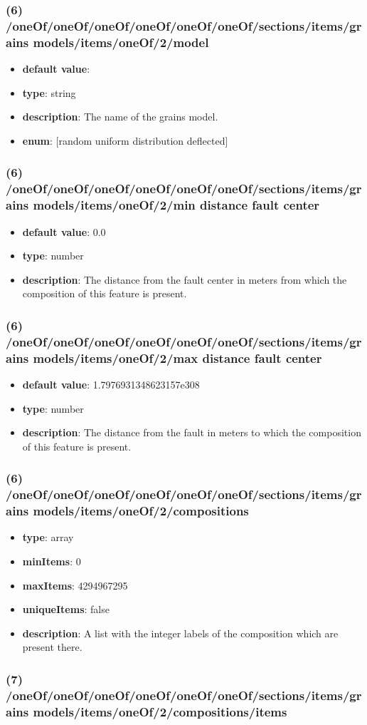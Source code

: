 \subsubsection{(6) /oneOf/oneOf/oneOf/oneOf/oneOf/oneOf/sections/items/grains models/items/oneOf/2/model}
\begin{itemize}[leftmargin=6em]\item {\bf default value}: 
\item {\bf type}: string
\item {\bf description}: The name of the grains model.
\item {\bf enum}: [random uniform distribution deflected]\end{itemize}\subsubsection{(6) /oneOf/oneOf/oneOf/oneOf/oneOf/oneOf/sections/items/grains models/items/oneOf/2/min distance fault center}
\begin{itemize}[leftmargin=6em]\item {\bf default value}: 0.0
\item {\bf type}: number
\item {\bf description}: The distance from the fault center in meters from which the composition of this feature is present.
\end{itemize}\subsubsection{(6) /oneOf/oneOf/oneOf/oneOf/oneOf/oneOf/sections/items/grains models/items/oneOf/2/max distance fault center}
\begin{itemize}[leftmargin=6em]\item {\bf default value}: 1.7976931348623157e308
\item {\bf type}: number
\item {\bf description}: The distance from the fault in meters to which the composition of this feature is present.
\end{itemize}\subsubsection{(6) /oneOf/oneOf/oneOf/oneOf/oneOf/oneOf/sections/items/grains models/items/oneOf/2/compositions}
\begin{itemize}[leftmargin=6em]\item {\bf type}: array
\item {\bf minItems}: 0
\item {\bf maxItems}: 4294967295
\item {\bf uniqueItems}: false
\item {\bf description}: A list with the integer labels of the composition which are present there.
\end{itemize}\subsubsection{(7) /oneOf/oneOf/oneOf/oneOf/oneOf/oneOf/sections/items/grains models/items/oneOf/2/compositions/items}
